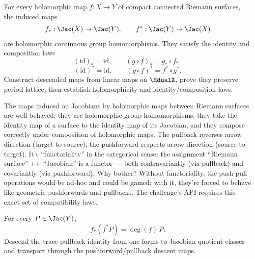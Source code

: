 \begin{theorem}
\label{thm:push-pull-functoriality}
For every holomorphic map \(f : X \to Y\) of compact connected Riemann
surfaces, the induced maps
\[
  f_{*} : \Jac(X) \to \Jac(Y),\qquad
  f^{*} : \Jac(Y) \to \Jac(X)
\]
are holomorphic continuous group homomorphisms. They satisfy the
identity and composition laws
\[
  (\mathrm{id})_*=\mathrm{id},\qquad (g\circ f)_*=g_*\circ f_*,
\]
\[
  (\mathrm{id})^{*}=\mathrm{id},\qquad (g\circ f)^{*}=f^{*}\circ g^{*}.
\]
\leanok
\proofplan
Construct descended maps from linear maps on \(\HdualX\), prove they preserve
period lattice, then establish holomorphicity and identity/composition laws.
\end{theorem}

\begin{layman}
The maps induced on Jacobians by holomorphic maps between Riemann
surfaces are well-behaved: they are holomorphic group homomorphisms,
they take the identity map of a surface to the identity map of its
Jacobian, and they compose correctly under composition of holomorphic
maps. The pullback reverses arrow direction (target to source); the
pushforward respects arrow direction (source to target). It's
``functoriality'' in the categorical sense: the assignment
``Riemann surface'' \(\mapsto\) ``Jacobian'' is a functor --- both
contravariantly (via pullback) and covariantly (via pushforward).
Why bother? Without functoriality, the push-pull operations would be
ad-hoc and could be gamed; with it, they're forced to behave like
geometric pushforwards and pullbacks. The challenge's API
requires this exact set of compatibility laws.
\end{layman}

\begin{theorem}
\label{thm:pushforward-pullback}
For every \(P\in\Jac(Y)\),
\[
  f_{*}(f^{*}P)=\deg(f)\,P.
\]
\leanok
\proofplan
Descend the trace-pullback identity from one-forms to Jacobian quotient classes
and transport through the pushforward/pullback descent maps.
\end{theorem}

